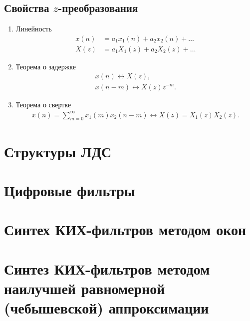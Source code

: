 \documentclass[a4paper, 14pt]{extarticle}
\begin{document}
\subsection{Свойства $z$-преобразования}
\begin{enumerate}
    \item Линейность
        \begin{equation}
            \begin{split}
                x(n) &= a_1 x_1(n) + a_2 x_2(n) + \ldots\\
                X(z) &= a_1 X_1(z) + a_2 X_2(z) + \ldots
            \end{split}
        \end{equation}
    \item Теорема о задержке
        \begin{equation}
            \begin{split}
                x(n) \leftrightarrow X(z),\\
                x(n-m) \leftrightarrow X(z) z^{-m}.
            \end{split}
        \end{equation}
    \item Теорема о свертке
        \begin{equation}
            \begin{split}
                x(n) = \sum^{\infty}_{m=0} x_1(m) x_2(n-m) \leftrightarrow X(z) = X_1(z) X_2(z).
            \end{split}
        \end{equation}
\end{enumerate}

\section{Структуры ЛДС}
\lipsum[1] %

\section{Цифровые фильтры}
\lipsum[1] %

\section{Синтех КИХ-фильтров методом окон}
\lipsum[1] %

\section{Синтез КИХ-фильтров методом наилучшей равномерной (чебышевской) аппроксимации}
\lipsum[1] %
\end{document}
